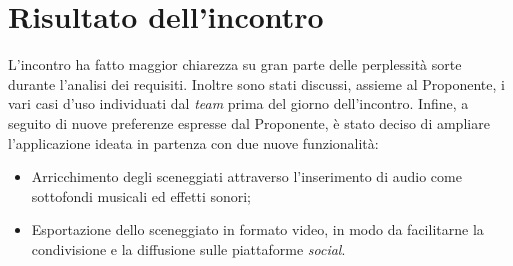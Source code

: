 \section{Risultato dell'incontro}
L'incontro ha fatto maggior chiarezza su gran parte delle perplessità sorte durante l'analisi dei requisiti.
Inoltre sono stati discussi, assieme al Proponente, i vari casi d'uso individuati dal \textit{team} prima del giorno dell'incontro.
Infine, a seguito di nuove preferenze espresse dal Proponente, è stato deciso di ampliare l'applicazione ideata in partenza con due nuove funzionalità:
\begin{itemize}
	\item Arricchimento degli sceneggiati attraverso l'inserimento di audio come sottofondi musicali ed effetti sonori;
	\item Esportazione dello sceneggiato in formato video, in modo da facilitarne la condivisione e la diffusione sulle piattaforme \textit{social}.
\end{itemize}
